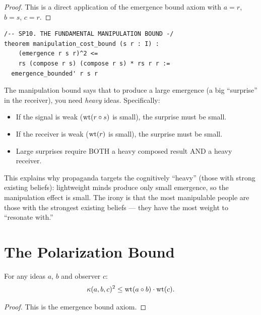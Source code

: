\begin{proof}
This is a direct application of the emergence bound axiom with $a = r$, $b = s$, $c = r$.
\end{proof}

\begin{lstlisting}
/-- SP10. THE FUNDAMENTAL MANIPULATION BOUND -/
theorem manipulation_cost_bound (s r : I) :
    (emergence r s r)^2 <=
    rs (compose r s) (compose r s) * rs r r :=
  emergence_bounded' r s r
\end{lstlisting}

\begin{paradox}
The manipulation bound says that to produce a large emergence (a big ``surprise'' in the receiver), you need \emph{heavy} ideas. Specifically:
\begin{itemize}
\item If the signal is weak ($\operatorname{wt}(r \circ s)$ is small), the surprise must be small.
\item If the receiver is weak ($\operatorname{wt}(r)$ is small), the surprise must be small.
\item Large surprises require BOTH a heavy composed result AND a heavy receiver.
\end{itemize}

This explains why propaganda targets the cognitively ``heavy'' (those with strong existing beliefs): lightweight minds produce only small emergence, so the manipulation effect is small. The irony is that the most manipulable people are those with the strongest existing beliefs --- they have the most weight to ``resonate with.''
\end{paradox}

\section{The Polarization Bound}

\begin{theorem}
\label{thm:polarization-bound}
For any ideas $a$, $b$ and observer $c$:
\[
\kappa(a,b,c)^2 \leq \operatorname{wt}(a \circ b) \cdot \operatorname{wt}(c).
\]
\end{theorem}

\begin{proof}
This is the emergence bound axiom.
\end{proof}

